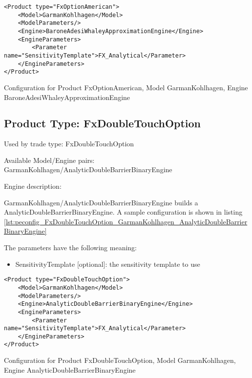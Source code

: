 \begin{longlisting}
\begin{verbatim}
<Product type="FxOptionAmerican">
    <Model>GarmanKohlhagen</Model>
    <ModelParameters/>
    <Engine>BaroneAdesiWhaleyApproximationEngine</Engine>
    <EngineParameters>
        <Parameter name="SensitivityTemplate">FX_Analytical</Parameter>
    </EngineParameters>
</Product>
\end{verbatim}
\caption{Configuration for Product FxOptionAmerican, Model GarmanKohlhagen, Engine BaroneAdesiWhaleyApproximationEngine}
\label{lst:peconfig_FxOptionAmerican_GarmanKohlhagen_BaroneAdesiWhaleyApproximationEngine}
\end{longlisting}

\subsection{Product Type: FxDoubleTouchOption}

Used by trade type: FxDoubleTouchOption

Available Model/Engine pairs: GarmanKohlhagen/AnalyticDoubleBarrierBinaryEngine

Engine description:

GarmanKohlhagen/AnalyticDoubleBarrierBinaryEngine builds a AnalyticDoubleBarrierBinaryEngine. A sample configuration is
shown in listing \ref{lst:peconfig_FxDoubleTouchOption_GarmanKohlhagen_AnalyticDoubleBarrierBinaryEngine}

The parameters have the following meaning:

\begin{itemize}
\item SensitivityTemplate [optional]: the sensitivity template to use 
\end{itemize}

\begin{longlisting}
\begin{verbatim}
<Product type="FxDoubleTouchOption">
    <Model>GarmanKohlhagen</Model>
    <ModelParameters/>
    <Engine>AnalyticDoubleBarrierBinaryEngine</Engine>
    <EngineParameters>
        <Parameter name="SensitivityTemplate">FX_Analytical</Parameter>
    </EngineParameters>
</Product>
\end{verbatim}
\caption{Configuration for Product FxDoubleTouchOption, Model GarmanKohlhagen, Engine AnalyticDoubleBarrierBinaryEngine}
\label{lst:peconfig_FxDoubleTouchOption_GarmanKohlhagen_AnalyticDoubleBarrierBinaryEngine}
\end{longlisting}

